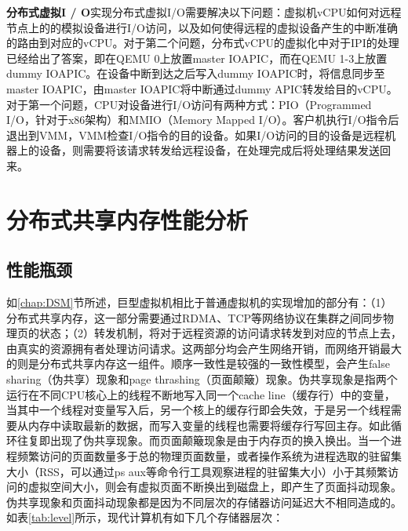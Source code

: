 \noindent\textbf{分布式虚拟I / O}\quad 实现分布式虚拟I/O需要解决以下问题：虚拟机vCPU如何对远程节点上的的模拟设备进行I/O访问，以及如何使得远程的虚拟设备产生的中断准确的路由到对应的vCPU。对于第二个问题，分布式vCPU的虚拟化中对于IPI的处理已经给出了答案，即在QEMU 0上放置master IOAPIC，而在QEMU 1-3上放置dummy IOAPIC。在设备中断到达之后写入dummy IOAPIC时，将信息同步至master IOAPIC，由master IOAPIC将中断通过dummy APIC转发给目的vCPU。对于第一个问题，CPU对设备进行I/O访问有两种方式：PIO（Programmed I/O，针对于x86架构）和MMIO（Memory Mapped I/O）。客户机执行I/O指令后退出到VMM，VMM检查I/O指令的目的设备。如果I/O访问的目的设备是远程机器上的设备，则需要将该请求转发给远程设备，在处理完成后将处理结果发送回来。

\section{分布式共享内存性能分析}
\subsection{性能瓶颈}
\label{chap:bottle}
如\ref{chap:DSM}节所述，巨型虚拟机相比于普通虚拟机的实现增加的部分有：（1）分布式共享内存，这一部分需要通过RDMA、TCP等网络协议在集群之间同步物理页的状态；（2）转发机制，将对于远程资源的访问请求转发到对应的节点上去，由真实的资源拥有者处理访问请求。这两部分均会产生网络开销，而网络开销最大的则是分布式共享内存这一组件。顺序一致性是较强的一致性模型，会产生false sharing（伪共享）现象和page thrashing（页面颠簸）现象\cite{sharing}。伪共享现象是指两个运行在不同CPU核心上的线程不断地写入同一个cache line（缓存行）中的变量，当其中一个线程对变量写入后，另一个核上的缓存行即会失效，于是另一个线程需要从内存中读取最新的数据，而写入变量的线程也需要将缓存行写回主存。如此循环往复即出现了伪共享现象。而页面颠簸现象是由于内存页的换入换出。当一个进程频繁访问的页面数量多于总的物理页面数量，或者操作系统为进程选取的驻留集大小（RSS，可以通过ps aux等命令行工具观察进程的驻留集大小）小于其频繁访问的虚拟空间大小，则会有虚拟页面不断换出到磁盘上，即产生了页面抖动现象。\label{chap:STOR}伪共享现象和页面抖动现象都是因为不同层次的存储器访问延迟大不相同造成的。如表\ref{tab:level}所示，现代计算机有如下几个存储器层次\cite{csapp}：

